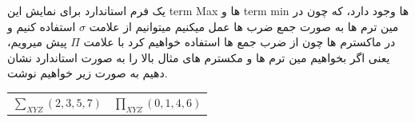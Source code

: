 \documentclass[20pt, a5paper]{article}
\begin{document}
\newpage

یک فرم استاندارد برای نمایش این term Max ها و term min ها وجود دارد، که چون در مین ترم ها به صورت جمع ضرب ها عمل میکنیم میتوانیم از علامت
$\sigma$
استفاده کنیم و در ماکسترم ها چون از ضرب جمع ها استفاده خواهیم کرد با علامت
$\Pi$
پیش میرویم، یعنی اگر بخواهیم مین ترم ها و مکسترم های مثال بالا را به صورت استاندارد نشان دهیم به صورت زیر خواهیم نوشت.

\begin{LTR}
	\begin{tabular}{c | c}
		$\sum_{XYZ} (2, 3, 5, 7)$ & $\prod_{XYZ} (0,1,4,6)$
	\end{tabular}
\end{LTR}




























\end{document}
